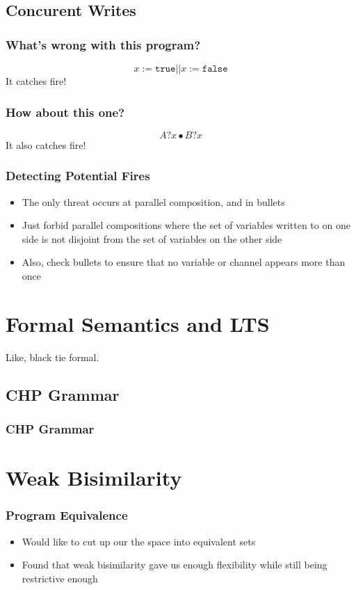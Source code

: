 \documentclass[compress]{beamer}
\begin{document}
\subsection{Concurent Writes}
\begin{frame}
\frametitle{What's wrong with this program?}
\begin{center}
    \begin{displaymath}
    x := \texttt{true} || x := \texttt{false}
    \end{displaymath}
    \pause
    \LARGE It catches fire!
\end{center}
\end{frame}
\begin{frame}
\frametitle{How about this one?}
\begin{center}
    \begin{displaymath}
    A?x \bullet B?x
    \end{displaymath}
    \pause
    \LARGE It also catches fire!
\end{center}
\end{frame}
\begin{frame}
\frametitle{Detecting Potential Fires}
\begin{itemize}
\item The only threat occurs at parallel composition, and in bullets
\pause
\item Just forbid parallel compositions where the set of variables written to on one side is not disjoint from the set of variables on the other side
\pause
\item Also, check bullets to ensure that no variable or channel appears more than once
\end{itemize}
\end{frame}
\section{Formal Semantics and LTS}
\begin{frame}
Like, black tie formal.
\end{frame}
\subsection{CHP Grammar}
\begin{frame}
\frametitle{CHP Grammar}
\end{frame}
\section{Weak Bisimilarity}
\begin{frame}
\frametitle{Program Equivalence}
\begin{itemize}
\item Would like to cut up our the space into equivalent sets
\item Found that weak bisimilarity gave us enough flexibility while still being restrictive enough
\end{itemize}
\end{frame}
\end{document}
